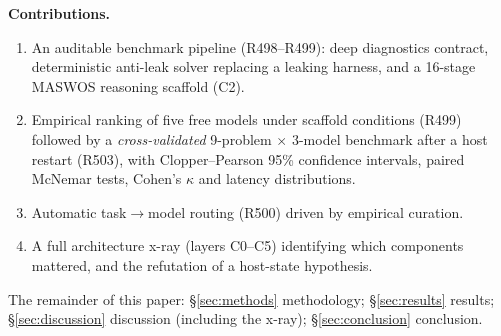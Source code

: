 \textbf{Contributions.}
\begin{enumerate}
  \item An auditable benchmark pipeline (R498--R499): deep diagnostics
  contract, deterministic anti-leak solver replacing a leaking harness, and a
  16-stage MASWOS reasoning scaffold (C2).
  \item Empirical ranking of five free models under scaffold conditions
  (R499) followed by a \emph{cross-validated} 9-problem $\times$ 3-model
  benchmark after a host restart (R503), with Clopper--Pearson 95\%
  confidence intervals, paired McNemar tests, Cohen's $\kappa$ and latency
  distributions.
  \item Automatic task$\rightarrow$model routing (R500) driven by empirical
  curation.
  \item A full architecture x-ray (layers C0--C5) identifying which
  components mattered, and the refutation of a host-state hypothesis.
\end{enumerate}

The remainder of this paper: \S\ref{sec:methods} methodology;
\S\ref{sec:results} results; \S\ref{sec:discussion} discussion (including
the x-ray); \S\ref{sec:conclusion} conclusion.